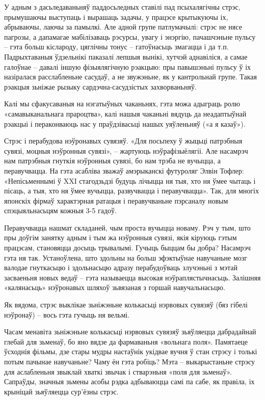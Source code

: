 У адным з дасьледаваньняў паддосьледных ставілі пад псыхалягічны стрэс, прымушаючы выступаць і вырашаць задачы, у працэсе крытыкуючы іх, абрываючы, лаючы за памылкі. Але адной групе патлумачылі: стрэс не нясе пагрозы, а дапамагае мабілізаваць рэсурсы, увагу і энэргію, пачашчэньне пульсу – гэта больш кіслароду, цяглічны тонус – гатоўнасьць змагацца і да т.п. Падрыхтаваныя ўдзельнікі паказалі лепшыя вынікі, хутчэй аднавіліся, а самае галоўнае – давалі іншую фізыялягічную рэакцыю: пры павышэньні пульсу ў іх назіралася расслабленьне сасудаў, а не звужэньне, як у кантрольнай групе. Такая рэакцыя зьніжае рызыку сардэчна-сасудзістых захворваньняў.

Калі мы сфакусаваныя на нэгатыўных чаканьнях, гэта можа адыграць ролю «самавыканальнага прароцтва», калі нашыя чаканьні вядуць да неадаптыўнай рэакцыі і пераконваюць нас у праўдзівасьці нашых уяўленьняў («а я казаў»).

Стрэс і перабудова нэўронавых сувязяў. «Для посьпеху ў жыцьці патрэбныя сувязі, моцныя нэўронныя сувязі», – жартуюць нэўрафізыёлягіі. Але насамрэч нам патрэбныя гнуткія нэўронныя сувязі, бо нам трэба не вучыцца, а перавучвацца. На гэта асабліва зважаў амэрыканскі футуроляг Элвін Тофлер: «Непісьменнымі ў XXI стагодзьдзі будуць лічыцца ня тыя, хто ня ўмее чытаць і пісаць, а тыя, хто ня ўмее вучыцца, развучвацца і перавучвацца». Так, для многіх японскіх фірмаў характэрная ратацыя і перавучваньне пэрсаналу новым спэцыяльнасьцям кожныя 3-5 гадоў.

Перавучвацца нашмат складаней, чым проста вучыцца новаму. Рэч у тым, што пры доўгім занятку адным і тым жа нэўронныя сувязі, якія кіруюць гэтым працэсам, становяцца досыць трывалымі. Гучыць быццам бы добра? Насамрэч гэта ня так. Устаноўлена, што здольны на больш эфэктыўнае навучаньне мозг валодае гнуткасьцю і здольнасьцю адразу перабудоўваць злучэньні з мэтай засваеньня новых ведаў – гэта называецца высокая нэўраплястычнасьць. Залішняя «калянасьць» нэўронавых шляхоў зьвязаная з горшай навучальнасьцю.

Як вядома, стрэс выклікае зьніжэньне колькасьці нэрвовых сувязяў (бяз гібелі нэўронаў) – вось гэта гучыць ня вельмі.

Часам менавіта зьніжэньне колькасьці нэрвовых сувязяў зьяўляецца дабрадайнай глебай для зьменаў, бо яно вядзе да фармаваньня «вольнага поля». Памятаеце ўсходнія фільмы, дзе стары мудры настаўнік укідвае вучня ў стан стрэсу і толькі потым пачынае навучаньне? Чаму ён гэта робіць? Мэта – выкарыстаньне стрэсу для аслабленьня звыклай хваткі звычак і стварэньня «поля для зьменаў». Сапраўды, значныя зьмены асобы рэдка адбываюцца самі па сабе, як правіла, іх крыніцай зьяўляецца сур'ёзны стрэс.

